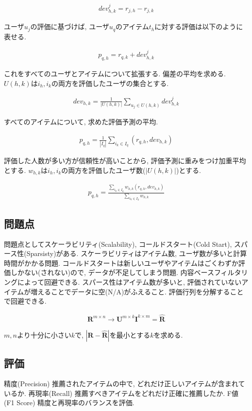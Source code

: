 \documentclass[dvipdfmx, 10pt]{jsarticle}
\begin{document}
\begin{align*}
    dev^{j}_{h, k} = r_{j,h} - r_{j, k}
\end{align*}

ユーザ\(u_j\)の評価に基づけば, ユーザ\(u_q\)のアイテム\(t_h\)に対する評価は以下のように表せる. 

\begin{align*}
    p_{q, h} = r_{q, k} + dev^{j}_{h, k}
\end{align*}

これをすべてのユーザとアイテムについて拡張する. 偏差の平均を求める. 
\(U(h, k)\)は\(i_h, i_k\)の両方を評価したユーザの集合とする. 

\begin{align*}
    dev_{h, k} = \frac{1}{|U(h, k)|} \sum_{u_j \in U(h, k)} dev^{j}_{h, k}
\end{align*}

すべてのアイテムについて, 求めた評価予測の平均. 

\begin{align*}
    p_{q, h} = \frac{1}{|I_q|} \sum_{i_k \in I_q} (r_{q, h}, dev_{h, k})
\end{align*}

評価した人数が多い方が信頼性が高いことから, 評価予測に重みをつけ加重平均とする. 
\(w_{h, k}\)は\(i_h, i_k\)の両方を評価したユーザ数(\(|U(h, k)|\))とする. 

\begin{align*}
    p_{q, h} = \frac{\sum_{i_k \in I_q} w_{h, k} (r_{q, h}, dev_{h, k})}{\sum_{i_k \in I_q} w_{h, k}}
\end{align*}

\subsection*{問題点}
問題点としてスケーラビリティ(Scalability), コールドスタート(Cold Start), スパース性(Sparsisty)がある. 
スケーラビリティはアイテム数, ユーザ数が多いと計算時間がかかる問題. 
コールドスタートは新しいユーザやアイテムはごくわずか評価しかない(されない)ので, データが不足してしまう問題. 
内容ベースフィルタリングによって回避できる. 
スパース性はアイテム数が多いと, 評価されていないアイテムが増えることでデータに空(N/A)がふえること. 
評価行列を分解することで回避できる. 

\begin{align*}
    \mathbf{R}^{m \times n} \rightarrow \mathbf{U}^{m \times k}  \mathbf{I}^{k \times m} = \hat{\mathbf{R}}
\end{align*}

\(m, n \)より十分に小さい\(k\)で, \(|\mathbf{R} - \hat{\mathbf{R}}|\)を最小とする\(k\)を求める. 

\subsection*{評価}
精度(Precision)
推薦されたアイテムの中で, どれだけ正しいアイテムが含まれているか. 
再現率(Recall)
推薦すべきアイテムをどれだけ正確に推薦したか. 
F値(F1 Score)
精度と再現率のバランスを評価. 
\end{document}
